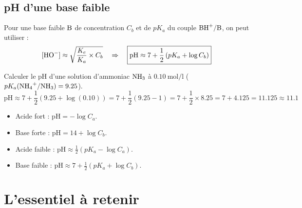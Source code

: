 \subsection{pH d'une base faible}

\begin{propriete}
Pour une base faible $\ce{B}$ de concentration $C_b$ et de $pK_a$ du couple $\ce{BH+/B}$, on peut utiliser :
\[
[\ce{HO-}] \approx \sqrt{\frac{K_e}{K_a} \times C_b} \quad \Rightarrow \quad \boxed{\text{pH} \approx 7 + \frac{1}{2} \left(pK_a + \log C_b\right)}
\]
\end{propriete}

\begin{exemple}
Calculer le pH d'une solution d'ammoniac $\ce{NH3}$ à $\SI{0.10}{\mol\per\litre}$ ($pK_a(\ce{NH4+/NH3}) = 9.25$).
\[
\text{pH} \approx 7 + \frac{1}{2} \left(9.25 + \log(0.10)\right) = 7 + \frac{1}{2} \left(9.25 - 1\right) = 7 + \frac{1}{2} \times 8.25 = 7 + 4.125 = 11.125 \approx 11.1
\]
\end{exemple}

\begin{aretenir}
\begin{itemize}
    \item Acide fort : $\text{pH} = -\log C_a$.
    \item Base forte : $\text{pH} = 14 + \log C_b$.
    \item Acide faible : $\text{pH} \approx \frac{1}{2}(pK_a - \log C_a)$.
    \item Base faible : $\text{pH} \approx 7 + \frac{1}{2}(pK_a + \log C_b)$.
\end{itemize}
\end{aretenir}

\section{L'essentiel à retenir}

